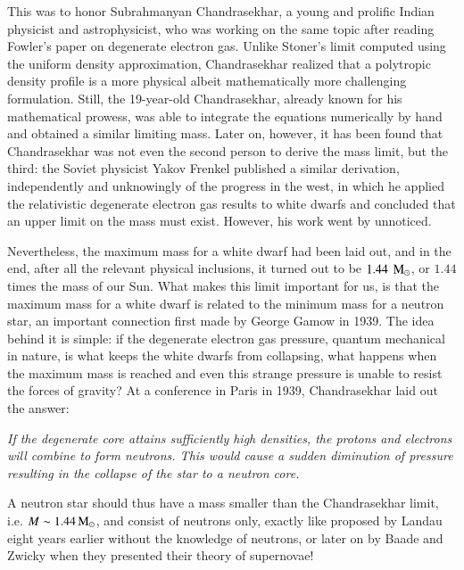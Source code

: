 This was to honor Subrahmanyan Chandrasekhar, a young and prolific Indian physicist and astrophysicist, who was working on the same topic after reading Fowler's paper on degenerate electron gas.
Unlike Stoner's limit computed using the uniform density approximation, Chandrasekhar realized that a polytropic density profile is a more physical albeit mathematically more challenging formulation.
Still, the 19-year-old Chandrasekhar, already known for his mathematical prowess, was able to integrate the equations numerically by hand and obtained a similar limiting mass\cite{Cha31}.
Later on, however, it has been found that Chandrasekhar was not even the second person to derive the mass limit, but the third:\cite{Yakovlev94}
the Soviet physicist Yakov Frenkel published a similar derivation, independently and unknowingly of the progress in the west, in which he applied the relativistic degenerate electron gas results to white dwarfs and concluded that an upper limit on the mass must exist\cite{Frenkel28}.
However, his work went by unnoticed.


Nevertheless, the maximum mass for a white dwarf had been laid out, and in the end, after all the relevant physical inclusions, it turned out to be $1.44~\, \mathrm{M}_{\odot}$, or $1.44$ times the mass of our Sun.
What makes this limit important for us, is that the maximum mass for a white dwarf is related to the minimum mass for a neutron star,
an important connection first made by George Gamow in 1939\cite{Gamow39}.
The idea behind it is simple: 
if the degenerate electron gas pressure, quantum mechanical in nature, is what keeps the white dwarfs from collapsing, what happens when the maximum mass is reached and even this strange pressure is unable to resist the forces of gravity?
At a conference in Paris in 1939, Chandrasekhar laid out the answer:
\begin{displayquote}
    \textit{
    If the degenerate core attains sufficiently high densities, the protons and electrons will combine to form neutrons. 
    This would cause a sudden diminution of pressure resulting in the collapse of the star to a neutron core.
    }
\end{displayquote}
A neutron star should thus have a mass smaller than the Chandrasekhar limit, i.e. $M \sim 1.44\, \mathrm{M}_{\odot}$, and consist of neutrons only, exactly like proposed by Landau eight years earlier without the knowledge of neutrons, or later on by Baade and Zwicky when they presented their theory of supernovae!


